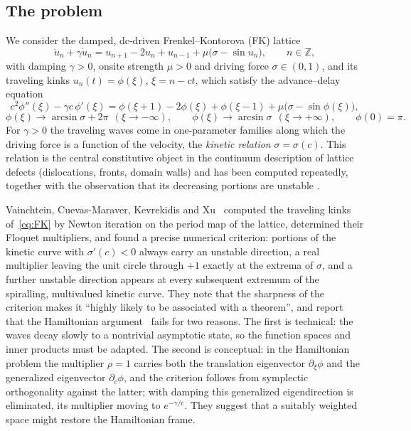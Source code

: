 \documentclass[11pt]{article}
\theoremstyle{plain}
\theoremstyle{definition}
\theoremstyle{remark}
\newcommand{\Z}{\mathbb{Z}}
\begin{document}
\subsection{The problem}

We consider the damped, dc-driven Frenkel--Kontorova (FK) lattice
\begin{equation}\label{eq:FK}
  \ddot u_n+\gamma\dot u_n=u_{n+1}-2u_n+u_{n-1}+\mu\bigl(\sigma-\sin u_n\bigr),
  \qquad n\in\Z,
\end{equation}
with damping $\gamma>0$, onsite strength $\mu>0$ and driving force $\sigma\in(0,1)$, and
its traveling kinks $u_n(t)=\phi(\xi)$, $\xi=n-ct$, which satisfy the advance--delay
equation
\begin{equation}\label{eq:TW}
  c^2\phi''(\xi)-\gamma c\,\phi'(\xi)
  =\phi(\xi+1)-2\phi(\xi)+\phi(\xi-1)+\mu\bigl(\sigma-\sin\phi(\xi)\bigr),
\end{equation}
\begin{equation}\label{eq:BC}
  \phi(\xi)\to\arcsin\sigma+2\pi\ \ (\xi\to-\infty),\qquad
  \phi(\xi)\to\arcsin\sigma\ \ (\xi\to+\infty),\qquad \phi(0)=\pi .
\end{equation}
For $\gamma>0$ the traveling waves come in one-parameter families along which the
driving force is a function of the velocity, the \emph{kinetic relation} $\sigma=\sigma(c)$.
This relation is the central constitutive object in the continuum description of lattice
defects (dislocations, fronts, domain walls) and has been computed repeatedly, together
with the observation that its decreasing portions are unstable
\cite{EW77,WvZSO96,SE98,BHZ00,Car04}.

Vainchtein, Cuevas-Maraver, Kevrekidis and Xu~\cite{VCKX20} computed the traveling kinks
of~\eqref{eq:FK} by Newton iteration on the period map of the lattice, determined their
Floquet multipliers, and found a precise numerical criterion: portions of the kinetic curve
with $\sigma'(c)<0$ always carry an unstable direction, a real multiplier leaving the unit
circle through $+1$ exactly at the extrema of $\sigma$, and a further unstable direction
appears at every subsequent extremum of the spiralling, multivalued kinetic curve. They
note that the sharpness of the criterion makes it ``highly likely to be associated with a
theorem'', and report that the Hamiltonian argument~\cite{FP04,CKVX17,XCKV18} fails for two
reasons. The first is technical: the waves decay slowly to a nontrivial asymptotic state, so
the function spaces and inner products must be adapted. The second is conceptual: in the
Hamiltonian problem the multiplier $\rho=1$ carries both the translation eigenvector
$\partial_\xi\phi$ and the generalized eigenvector $\partial_c\phi$, and the criterion
follows from symplectic orthogonality against the latter; with damping this generalized
eigendirection is eliminated, its multiplier moving to $e^{-\gamma/c}$. They suggest that a
suitably weighted space might restore the Hamiltonian frame.
\end{document}
